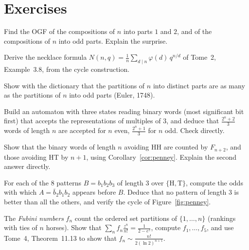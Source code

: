 \section{Exercises}

\begin{exercise}[$\star$]\label{ex:compositions}
Find the OGF of the compositions of $n$ into parts $1$ and $2$, and of the compositions of $n$ into odd parts. Explain the surprise.
\end{exercise}

\begin{exercise}[$\star$]\label{ex:necklacecyc}
Derive the necklace formula $N(n,q)=\frac1n\sum_{d\mid n}\varphi(d)\,q^{n/d}$ of Tome~2, Example~3.8, from the cycle construction.
\end{exercise}

\begin{exercise}[$\star$]\label{ex:eulerodd}
Show with the dictionary that the partitions of $n$ into distinct parts are as many as the partitions of $n$ into odd parts (Euler, 1748).
\end{exercise}

\begin{exercise}[$\star$]\label{ex:mod3}
Build an automaton with three states reading binary words (most significant bit first) that accepts the representations of
multiples of $3$, and deduce that $\frac{2^n+2}3$ words of length $n$ are accepted for $n$ even, $\frac{2^n+1}3$ for $n$ odd. Check directly.
\end{exercise}

\begin{exercise}[$\star$]\label{ex:avoid}
Show that the binary words of length $n$ avoiding HH are counted by $F_{n+2}$, and those avoiding HT by $n+1$, using
Corollary~\ref{cor:penney}. Explain the second answer directly.
\end{exercise}

\begin{exercise}[$\star\star$]\label{ex:penney}
For each of the $8$ patterns $B=b_1b_2b_3$ of length $3$ over $\{\mathrm H,\mathrm T\}$, compute the odds with which $A=\bar b_2b_1b_2$ appears before $B$. Deduce that no pattern of
length $3$ is better than all the others, and verify the cycle of Figure~\ref{fig:penney}.
\end{exercise}

\begin{exercise}[$\star\star$]\label{ex:fubini}
The \emph{Fubini numbers} $f_n$ count the ordered set partitions of $\{1,\dots,n\}$ (rankings with ties of $n$ horses). Show that $\sum_nf_n\frac{z^n}{n!}=\frac1{2-e^z}$, compute
$f_1,\dots,f_5$, and use Tome~4, Theorem~11.13 to show that $f_n\sim\frac{n!}{2(\ln2)^{n+1}}$.
\end{exercise}

